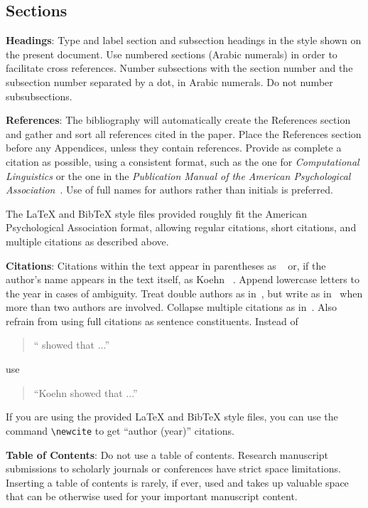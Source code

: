 \documentclass[11pt,table,xcdraw]{article}
\begin{document}
\subsection{Sections}

{\bf Headings}: Type and label section and subsection headings in the
style shown on the present document.  Use numbered sections (Arabic
numerals) in order to facilitate cross references. Number subsections
with the section number and the subsection number separated by a dot,
in Arabic numerals. Do not number subsubsections.

\textbf{References}: The bibliography will automatically create the References section and gather and sort all references cited in the paper.  Place the References section before any Appendices, unless they contain references.  Provide as complete a citation as possible, using a consistent format, such as the one for {\em Computational Linguistics\/} or the one in the {\em Publication Manual of the American Psychological Association\/}~\cite{american2010publication}.  Use of full names for authors rather than initials is preferred.

The \LaTeX{} and Bib\TeX{} style files provided roughly fit the American Psychological Association format, allowing regular citations, short citations, and multiple citations as described above.

{\bf Citations}: Citations within the text appear in parentheses as ~\cite{Koehn} or, if the author's name appears in the text itself, as Koehn ~. Append lowercase letters to the year in cases of ambiguity.  Treat double authors as in~\cite{Hazem}, but write as in~\cite{Luong2} when more than two authors are involved. Collapse multiple citations as in~\cite{Hazem,Luong2}. Also refrain from using full citations
as sentence constituents. Instead of 

\begin{quote} ``\cite{Koehn} showed that ...''
\end{quote}
use
\begin{quote}
``Koehn    showed that ...''
\end{quote}

If you are using the provided \LaTeX{} and Bib\TeX{} style files, you
can use the command \verb|\newcite| to get ``author (year)'' citations.

{\bf Table of Contents}: Do not use a table of contents. Research manuscript submissions to scholarly journals or conferences have strict space limitations. Inserting a table of contents is rarely, if ever, used and takes up valuable space that can be otherwise used for your important manuscript content.
\end{document}
